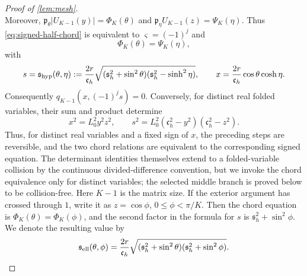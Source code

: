 \documentclass[review,hidelinks,onefignum,onetabnum]{siamart251216}
\begin{document}
\begin{proof}[Proof of \cref{lem:mesh}]
\[\]
Moreover,
\(\mathfrak p_\theta|U_{K-1}(y)|=\Phi_K(\theta)\) and
\(\mathfrak p_\eta U_{K-1}(z)=\Psi_K(\eta)\).  Thus
\eqref{eq:signed-half-chord} is equivalent to
\(\varsigma=(-1)^j\) and
\begin{equation}\label{eq:chord-equation}
 \Phi_K(\theta)=\Psi_K(\eta),
\end{equation}
with
\begin{equation}\label{eq:channel-xs}
 s=\mathfrak s_{\rm hyp}(\theta,\eta)
 :=\frac{2r}{\mathfrak c_h}
 \sqrt{(\mathfrak s_h^2+\sin^2\theta)
       (\mathfrak s_h^2-\sinh^2\eta)},\qquad
 x=\frac{2r}{\mathfrak c_h}\cos\theta\cosh\eta.
\end{equation}
Consequently \(q_{K-1}(x,(-1)^js)=0\).  Conversely, for distinct real
folded variables, their sum and product determine
\[
 x^2=L_0^2y^2z^2,\qquad
 s^2=L_0^2(\mathfrak c_h^2-y^2)(\mathfrak c_h^2-z^2).
\]
Thus, for distinct real variables and a fixed sign of \(x\), the
preceding steps are reversible, and the two chord relations are
equivalent to the corresponding signed equation.  The determinant
identities themselves extend to a folded-variable collision by the
continuous divided-difference convention, but we invoke the chord
equivalence only for distinct variables; the selected middle branch is
proved below to be collision-free.
Here \(K-1\) is the matrix size.  If the exterior argument has crossed
through \(1\), write it as \(z=\cos\phi\),
\(0\leq\phi<\pi/K\).  Then the chord equation is
\(\Phi_K(\theta)=\Phi_K(\phi)\), and the second factor in the formula
for \(s\) is \(\mathfrak s_h^2+\sin^2\phi\).  We denote the resulting
value by
\[
 \mathfrak s_{\rm ell}(\theta,\phi)
 =\frac{2r}{\mathfrak c_h}
 \sqrt{(\mathfrak s_h^2+\sin^2\theta)
       (\mathfrak s_h^2+\sin^2\phi)}.
\]


\end{proof}
\end{document}
